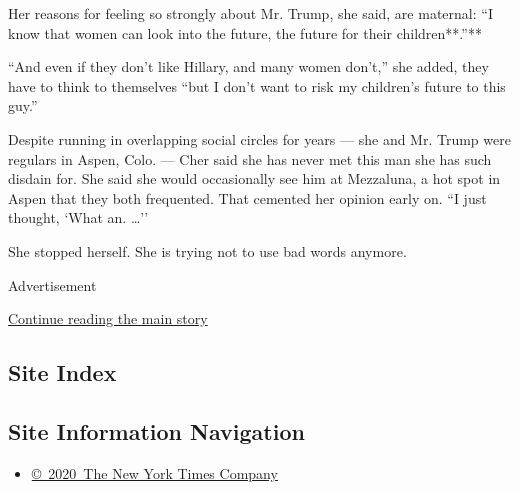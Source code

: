 Her reasons for feeling so strongly about Mr. Trump, she said, are
maternal: ``I know that women can look into the future, the future for
their children**.''**

``And even if they don't like Hillary, and many women don't,'' she
added, they have to think to themselves ``but I don't want to risk my
children's future to this guy.''

Despite running in overlapping social circles for years --- she and Mr.
Trump were regulars in Aspen, Colo. --- Cher said she has never met this
man she has such disdain for. She said she would occasionally see him at
Mezzaluna, a hot spot in Aspen that they both frequented. That cemented
her opinion early on. ``I just thought, `What an. \ldots{}''

She stopped herself. She is trying not to use bad words anymore.

Advertisement

\protect\hyperlink{after-bottom}{Continue reading the main story}

\hypertarget{site-index}{%
\subsection{Site Index}\label{site-index}}

\hypertarget{site-information-navigation}{%
\subsection{Site Information
Navigation}\label{site-information-navigation}}

\begin{itemize}
\tightlist
\item
  \href{https://help.nytimes.com/hc/en-us/articles/115014792127-Copyright-notice}{©~2020~The
  New York Times Company}
\end{itemize}

